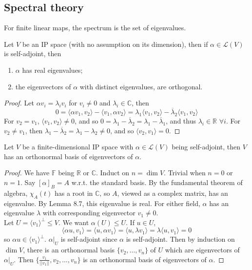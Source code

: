 \documentclass[a4paper]{article}
\begin{document}
\subsection{Spectral theory}
\begin{defi}[Spectrum]
For finite linear maps, the spectrum is the set of eigenvalues.
\end{defi}
\begin{lemma}
Let $V$ be an IP space (with no assumption on its dimension), then if $\alpha\in\mathcal{L}(V)$ is self-adjoint, then
\begin{enumerate}
    \item $\alpha$ has real eigenvalues;
    \item the eigenvectors of $\alpha$ with distinct eigenvalues, are orthogonal.
\end{enumerate}
\end{lemma}
\begin{proof}
Let $\alpha v_i=\lambda_iv_i$ for $v_i\neq 0$ and $\lambda_i\in\mathbb{C}$, then
$$0=\langle\alpha v_1,v_2\rangle-\langle v_1,\alpha v_2\rangle=\lambda_1\langle v_1,v_2\rangle-\overline{\lambda}_2\langle v_1,v_2\rangle$$
For $v_2=v_1$, $\langle v_1,v_2\rangle\neq 0$, and so $0=\lambda_1-\overline{\lambda}_2=\lambda_1-\overline{\lambda}_1$, and thus $\lambda_i\in\mathbb{R}$ $\forall i$. For $v_2\neq v_1$, then $\lambda_1-\overline{\lambda}_2=\lambda_1-\lambda_2\neq 0$, and so $\langle v_2,v_1\rangle=0$.
\end{proof}
\begin{thm}
Let $V$ be a finite-dimensional IP space with $\alpha\in\mathcal{L}(V)$ being self-adjoint, then $V$ has an orthonormal basis of eigenvectors of $\alpha$.
\end{thm}
\begin{proof}
We have $\mathbb{F}$ being $\mathbb{R}$ or $\mathbb{C}$. Induct on $n=\dim V$. Trivial when $n=0$ or $n=1$. Say $[\alpha]_B=A$ w.r.t. the standard basis. By the fundamental theorem of algebra, $\chi_A(t)$ has a root in $\mathbb{C}$, so $A$, viewed as a complex matrix, has an eigenvalue. By Lemma 8.7, this eigenvalue is real. For either field, $\alpha$ has an eigenvalue $\lambda$ with corresponding eigenvector $v_1\neq 0$.\\[5pt]
Let $U=\langle v_1\rangle^\perp\leq V$. We want $\alpha(U)\leq U$. If $u\in U$, 
$$\langle\alpha u,v_1\rangle=\langle u,\alpha v_1\rangle=\langle u,\lambda v_1\rangle=\lambda\langle u,v_1\rangle=0$$
so $\alpha u\in\langle v_1\rangle^\perp$.  $\alpha|_U$ is self-adjoint since $\alpha$ is self-adjoint. Then by induction on $\dim V$, there is an orthonormal basis $\{v_2,\dots,v_n\}$ of $U$ which are eigenvectors of $\alpha|_U$. Then $\{\frac{v_1}{||v_1||},v_2,\dots,v_n\}$ is an orthonormal basis of eigenvectors of $\alpha$.
\end{proof}
\end{document}
